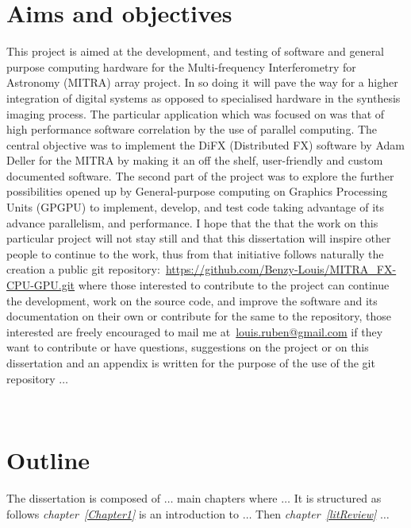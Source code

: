 \section{Aims and objectives}
\label{sec:aboutAimObjectives}
This project is aimed at the development, and testing of software and general purpose computing hardware for the Multi-frequency Interferometry for Astronomy (MITRA) array project. In so doing it will pave the way for a higher integration of digital systems as opposed to specialised hardware in the synthesis imaging process. The particular application which was focused on was that of high performance software correlation by the use of parallel computing. The central objective was to implement the DiFX (Distributed FX) software by Adam Deller for the MITRA by making it an off the shelf, user-friendly and custom documented software. The second part of the project was to explore the further possibilities opened up by General-purpose computing on Graphics Processing Units (GPGPU) to implement, develop, and test code taking advantage of its advance parallelism, and performance. I hope that the that the work on this particular project will not stay still and that this dissertation will inspire other people to continue to the work, thus from that initiative follows naturally the creation a public git repository:~\url{https://github.com/Benzy-Louis/MITRA_FX-CPU-GPU.git} where those interested to contribute to the project can continue the development, work on the source code, and improve the software and its documentation on their own or contribute for the same to the repository, those interested are freely encouraged to mail me at~\href{mailto:louis.ruben@gmail.com}{louis.ruben@gmail.com} if they want to contribute or have questions, suggestions on the project or on this dissertation and an appendix is written for the purpose of the use of the git repository $\ldots$

\
\section{Outline}
\label{sec:outline}
The dissertation is composed of $\ldots$ main chapters where $\ldots$ It is structured as follows \textit{chapter~\ref{Chapter1}} is an introduction to $\ldots$ Then \textit{chapter~\ref{litReview}} $\ldots$